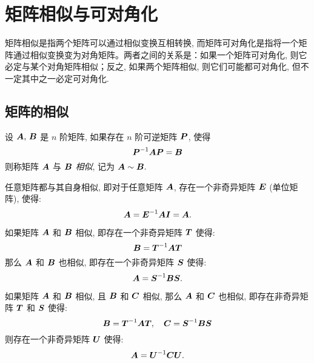 \section{矩阵相似与可对角化}

矩阵相似是指两个矩阵可以通过相似变换互相转换, 而矩阵可对角化是指将一个矩阵通过相似变换变为对角矩阵。两者之间的关系是：如果一个矩阵可对角化, 则它必定与某个对角矩阵相似；反之, 如果两个矩阵相似, 则它们可能都可对角化, 但不一定其中之一必定可对角化.

\subsection{矩阵的相似}

\begin{definition}[矩阵的相似]
    设 $\vb*{A}\text{, }\vb*{B}$ 是 $n$ 阶矩阵, 如果存在 $n$ 阶可逆矩阵 $\vb*{P}$, 使得 $$\vb*{P}^{-1}\vb*{AP}=\vb*{B}$$
    则称矩阵 $\vb*{A}$ 与 $\vb*{B}$ \textit{相似}, 记为 $\vb*{A}\sim\vb*{B}.$
\end{definition}

\begin{theorem}[相似的反身性]
    任意矩阵都与其自身相似, 即对于任意矩阵 $\vb*{A}$, 存在一个非奇异矩阵 $\vb*{E}$ (单位矩阵), 使得:
    $$\vb*{A}=\vb*{E}^{-1} \vb*{A I}=\vb*{A}.$$
\end{theorem}

\begin{theorem}[相似的对称性]
    如果矩阵 $\vb*{A}$ 和 $\vb*{B}$ 相似, 即存在一个非奇异矩阵 $\vb*{T}$ 使得:
    $$\vb*{B}=\vb*{T}^{-1} \vb*{A T}$$
    那么 $\vb*{A}$ 和 $\vb*{B}$ 也相似, 即存在一个非奇异矩阵 $\vb*{S}$ 使得:
    $$\vb*{A}=\vb*{S}^{-1} \vb*{B S}.$$
\end{theorem}

\begin{theorem}[相似的传递性]
    如果矩阵 $\vb*{A}$ 和 $\vb*{B}$ 相似, 且 $\vb*{B}$ 和 $\vb*{C}$ 相似, 那么 $\vb*{A}$ 和 $\vb*{C}$ 也相似, 即存在非奇异矩阵 $\vb*{T}$ 和 $\vb*{S}$ 使得:
    $$\vb*{B}=\vb*{T}^{-1} \vb*{A T}, \quad \vb*{C}=\vb*{S}^{-1} \vb*{B S}$$
    则存在一个非奇异矩阵 $\vb*{U}$ 使得:
    $$\vb*{A}=\vb*{U}^{-1} \vb*{C U}.$$
\end{theorem}


